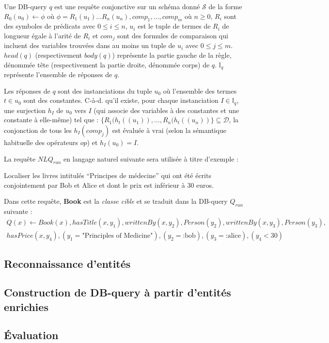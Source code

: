 \begin{definition}[DB-query]
    Une DB-query $q$ est une requête conjonctive sur un schéma donné $\mathcal{S}$ de la forme $R_0(u_0) \leftarrow \phi$ où $\phi = R_1(u_1) \dots  R_n(u_n), comp_1, \dots, comp_m$ où $n \geq 0$, $R_i$ sont des symboles de prédicats avec $0 \leq i \leq n$, $u_i$ est le tuple de termes de $R_i$ de longueur égale à l'arité de $R_i$ et $com_j$ sont des formules de comparaison qui incluent des variables trouvées dans au moins un tuple de $u_i$ avec $0 \leq j \leq m$.
    $head(q)$ (respectivement $body(q)$) représente la partie gauche de la règle, dénommée tête (respectivement la partie droite, dénommée corps) de $q$.
    $\mathbb{I}_q$ représente l'ensemble de réponses de $q$.

    Les réponses de $q$ sont des instanciations du tuple $u_0$ où l'ensemble des termes $t \in u_0$ sont des constantes.
    C-à-d. qu'il existe, pour chaque instanciation $I \in \mathbb{I}_q$, une surjection $h_I$ de $u_0$ vers $I$ (qui associe des variables à des constantes et une constante à elle-même) tel que : $\{R_1(h_t((u_1)), \dots, R_n(h_t((u_n))\} \subseteq \mathcal{D}$, la conjonction de tous les $h_I(comp_j)$ est évaluée à vrai (selon la sémantique habituelle des opérateurs $op$) et $h_I(u_0)= I$.

\end{definition}

\begin{example}
    La requête $NLQ_{run}$ en langage naturel suivante sera utilisée à titre d'exemple :
    \begin{displayquote}
        Localiser les livres intitulés \enquote{Principes de médecine} qui ont été écrits conjointement par Bob et Alice et dont le prix est inférieur à 30 euros.
    \end{displayquote}

    Dans cette requête, \textbf{Book} est la \emph{classe cible} et se traduit dans la DB-query $Q_{run}$ suivante :
    \begin{multline*}
        Q(x)  \leftarrow Book (x), hasTitle (x, y_1), writtenBy (x, y_2), Person (y_2), writtenBy (x, y_3), Person(y_3),\\
        hasPrice(x, y_4), (y_1 = \text{"Principles of Medicine"}), (y_2= \text{:bob}), (y_3 = \text{:alice}), (y_4 < 30)
    \end{multline*}
\end{example}

\subsection{Reconnaissance d'entités}


\subsection{Construction de DB-query à partir d'entités enrichies}


\subsection{Évaluation}


